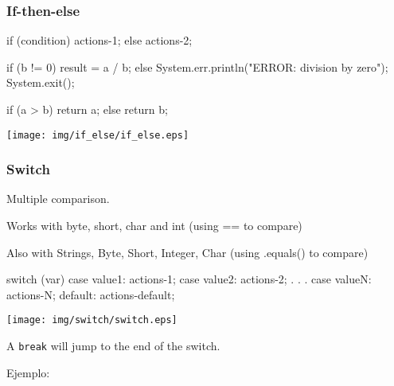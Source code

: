 \documentclass[a4paper, 9pt]{extarticle}
\begin{document}
\subsubsection{If-then-else}

\begin{multicols}{2}
\begin{blackboard}
        if (condition) {
            actions-1;
        } else {
            actions-2;
        }

if (b != 0) {
    result = a / b;
} else {
    System.err.println("ERROR: division by zero");
    System.exit();
}

if (a > b) {
  return a;
} else {
  return b;
}
\end{blackboard}

\columnbreak

  \begin{center}
    \texttt{[image: img/if\_else/if\_else.eps]}
  \end{center}
\end{multicols}


\subsubsection{Switch}

Multiple comparison.

Works with byte, short, char and int (using == to compare)

Also with Strings, Byte, Short, Integer, Char (using .equals() to compare)

\begin{multicols}{2}
\begin{blackboard}
        switch (var) {
            case value1:
                actions-1;
            case value2:
                actions-2;
            .
            .
            .
            case valueN:
                actions-N;
            default:
                actions-default;
        }
\end{blackboard}

\columnbreak

  \begin{center}
    \texttt{[image: img/switch/switch.eps]}
  \end{center}
\end{multicols}

A \verb+break+ will jump to the end of the switch.

Ejemplo:

\end{document}
